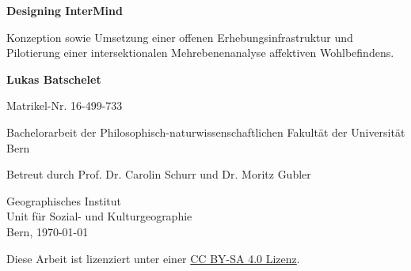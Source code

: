 \documentclass{template}
\begin{document}

\begin{titlepage}
\sffamily
\raggedright

\vspace*{1cm}
\huge
\textbf{Designing InterMind}

\vspace{0.5cm}
\large
Konzeption sowie Umsetzung einer offenen Erhebungsinfrastruktur und Pilotierung einer intersektionalen Mehrebenenanalyse affektiven Wohlbefindens.

\vspace{1.5cm}
\textbf{Lukas Batschelet}

\vspace{0.5cm}
Matrikel-Nr. 16-499-733

\vfill
\normalsize
Bachelorarbeit der Philosophisch-naturwissenschaftlichen Fakultät der Universität Bern

\vspace{0.8cm}
Betreut durch Prof. Dr. Carolin Schurr und Dr. Moritz Gubler


Geographisches Institut \\
Unit für Sozial- und Kulturgeographie\\
Bern, \today

\end{titlepage}



\clearpage

\begin{abstract}

\end{abstract}

\vfill
\noindent
Diese Arbeit ist lizenziert unter einer 
\href{https://creativecommons.org/licenses/by-sa/4.0/}
{CC BY-SA 4.0 Lizenz}. \ccbysa


\clearpage


\begingroup
  \let\clearpage\relax
  \let\cleardoublepage\relax
  \setlength{\parskip}{0pt}
  \setlength{\itemsep}{0pt plus 0.15pt}
  \tableofcontents
\endgroup



\begingroup
  \let\clearpage\relax
  \let\cleardoublepage\relax
  \printglossary[
    type=\acronymtype,
    title=Abkürzungsverzeichnis,
    toctitle=Abkürzungsverzeichnis,
    nonumberlist,
    nogroupskip
  ]
\endgroup
\end{document}
